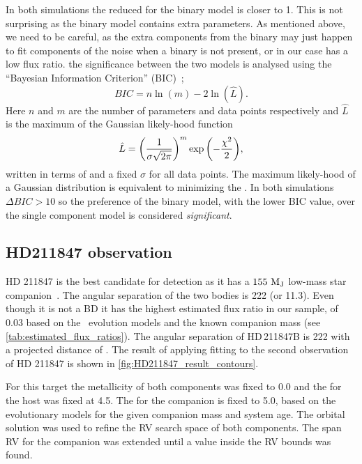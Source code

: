 In both simulations the reduced \textchisquaredreduced{} for the binary model is closer to 1.
This is not surprising as the binary model contains extra parameters.
As mentioned above, we need to be careful, as the extra components from the binary may just happen to fit components of the noise when a binary is not present, or in our case has a low flux ratio.
{\red{} the significance between the two models is analysed using the ``Bayesian Information Criterion'' ({BIC})~\citep{schwarz_estimating_1978}; }
\begin{equation}
{BIC} = n\ln{(m)} - 2\ln{(\hat{L})}.
\end{equation}
{\red{} Here \(n\) and \(m\) are the number of parameters and data points respectively and \(\hat{L}\) is the maximum of the Gaussian likely-hood function}
\begin{equation}
\hat{L} = {\left(\frac{1}{\sigma \sqrt{2\pi}}\right)}^{m} \exp{\left(-\frac{{\chi}^{2}}{2}\right)},
\end{equation}
{\red{} written in terms of \textchisquared{} and a fixed \(\sigma\) for all data points.
    The maximum likely-hood of a Gaussian distribution is equivalent to minimizing the \textchisquared.
    In both simulations \(\Delta {BIC} >10\) so the preference of the binary model, with the lower {BIC} value, over the single component model is considered \emph{significant}.}

\subsection{HD211847 observation}
\label{subsec:results-hd211847}
{HD 211847} is the best candidate for detection as it has a \(\rm 155~M_J\) low-mass star companion~\citet{moutou_eccentricity_2017}.
The angular separation of the two bodies is 222\mas{} (or 11.3\AU).
Even though it is not a {BD} it has the highest estimated flux ratio in our sample, of 0.03 based on the~\citet{baraffe_new_2015} evolution models and the known companion mass (see \cref{tab:estimated_flux_ratios}).
The angular separation of HD\,211847B is 222\mas{} with a projected distance of .
The result of applying \textchisquared{} fitting to the second observation of {HD 211847} is shown in \cref{fig:HD211847_result_contours}.

For this target the metallicity of both components was fixed to 0.0 and the \logg{} for the host was fixed at 4.5.
The \logg{} for the companion is fixed to 5.0, based on the~\citet{baraffe_new_2015} evolutionary models for the given companion mass and system age.
The orbital solution was used to refine the {RV} search space of both components.
The span {RV} for the companion was extended until a value inside the {RV} bounds was found.

